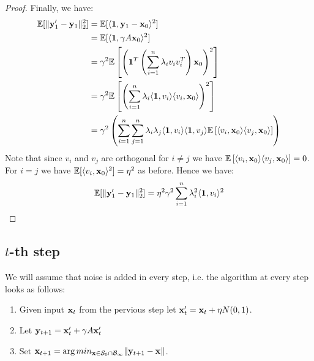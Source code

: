 \begin{proof}
	Finally, we have:
	\begin{align*}
	\mathbb E[\|\mathbf y_1' - \mathbf y_1\|_2^2] &= \mathbb E[\langle \mathbf{1}, \mathbf y_1 - \mathbf x_0 \rangle^2 ] \\
	&= \mathbb E[\langle \mathbf{1}, \gamma A \mathbf x_0 \rangle^2] \\
	&= \gamma^2 \mathbb E\left[\left(\mathbf{1}^T \left(\sum_{i = 1}^n \lambda_i v_i v_i^T\right) \mathbf x_0\right)^2\right] \\
	&= \gamma^2 \mathbb E\left[ \left(\sum_{i = 1}^n \lambda_i \langle\mathbf{1}, v_i\rangle \langle v_i, \mathbf x_0\rangle \right)^2 \right] \\
	&= \gamma^2 \left(\sum_{i = 1}^n \sum_{j = 1}^n\lambda_i \lambda_j \langle\mathbf{1}, v_i\rangle \langle \mathbf{1}, v_j\rangle \mathbb E\left[\langle v_i, \mathbf x_0\rangle \langle v_j, \mathbf x_0\rangle\right]\right)
	\end{align*}
	Note that since $v_i$ and $v_j$ are orthogonal for $i \neq j$ we have $\mathbb E\left[\langle v_i, \mathbf x_0\rangle \langle v_j, \mathbf x_0\rangle\right] = 0$. For $i = j$ we have $\mathbb E[\langle v_i, \mathbf x_0\rangle^2] = \eta^2$ as before. Hence we have:
	\begin{align*}
	\mathbb E[\|\mathbf y_1' - \mathbf y_1\|_2^2] = \eta^2 \gamma^2 \sum_{i = 1}^n \lambda_i^2 \langle \mathbf{1}, v_i \rangle^2
	\end{align*}
	
	
\end{proof}


\subsection{$t$-th step}

We will assume that noise is added in every step, i.e. the algorithm at every step looks as follows:
\begin{enumerate}
	\item Given input $\mathbf x_t$ from the pervious step let $\mathbf x_t' = \mathbf x_t + \eta N(0,1)$.
	\item Let $\mathbf y_{t + 1} = \mathbf x_t' + \gamma A \mathbf x_t'$
	\item Set $\mathbf x_{t + 1} = \arg min_{\mathbf x \in \mathcal S_0 \cap \mathcal B_\infty} \|\mathbf y_{t + 1} - \mathbf x\|$.
\end{enumerate}

